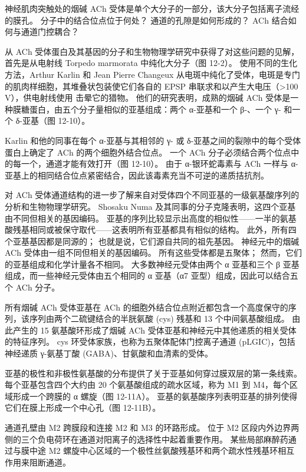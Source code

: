 神经肌肉突触处的烟碱 ACh 受体是单个大分子的一部分，该大分子包括离子流经的膜孔。 
分子中的结合位点位于何处？ 通道的孔隙是如何形成的？ ACh 结合如何与通道门控耦合？


从 ACh 受体蛋白及其基因的分子和生物物理学研究中获得了对这些问题的见解，首先是从电射线 Torpedo marmorata 中纯化大分子（图 12-2）。 
使用不同的生化方法，Arthur Karlin 和 Jean Pierre Changeux 从电斑中纯化了受体，电斑是专门的肌肉样细胞，其堆叠状包装使它们各自的 EPSP 串联求和以产生大电压（>100 V），供电射线使用 击晕它的猎物。 
他们的研究表明，成熟的烟碱 ACh 受体是一种膜糖蛋白，由五个分子量相似的亚基组成：两个 α-亚基和一个 β-、一个 γ- 和一个 δ-亚基（图 12-10）。


Karlin 和他的同事在每个 α-亚基与其相邻的 γ- 或 δ-亚基之间的裂隙中的每个受体蛋白上确定了 ACh 的两个细胞外结合位点。 
一个 ACh 分子必须结合两个位点中的每一个，通道才能有效打开（图 12-10）。 
由于 α-银环蛇毒素与 ACh 一样与 α-亚基上的相同结合位点紧密结合，因此该毒素充当不可逆的递质拮抗剂。


对 ACh 受体通道结构的进一步了解来自对受体四个不同亚基的一级氨基酸序列的分析和生物物理学研究。 
Shosaku Numa 及其同事的分子克隆表明，这四个亚基由不同但相关的基因编码。 
亚基的序列比较显示出高度的相似性——一半的氨基酸残基相同或被保守取代——这表明所有亚基都具有相似的结构。 
此外，所有四个亚基基因都是同源的； 也就是说，它们源自共同的祖先基因。 
神经元中的烟碱 ACh 受体由一组不同但相关的基因编码。 
所有这些受体都是五聚体； 然而，它们的亚基组成和化学计量各不相同。 
大多数神经元受体由两个 α 亚基和三个 β 亚基组成，而一些神经元受体由五个相同的 α 亚基（α7 亚型）组成，因此可以结合五个 ACh 分子。


所有烟碱 ACh 受体亚基在 ACh 的细胞外结合位点附近都包含一个高度保守的序列，该序列由两个二硫键结合的半胱氨酸 (cys) 残基和 13 个中间氨基酸组成。 
由此产生的 15 氨基酸环形成了烟碱 ACh 受体亚基和神经元中其他递质的相关受体的特征序列。 cys 环受体家族，也称为五聚体配体门控离子通道 (pLGIC)，包括神经递质 γ-氨基丁酸 (GABA)、甘氨酸和血清素的受体。


亚基的极性和非极性氨基酸的分布提供了关于亚基如何穿过膜双层的第一条线索。 
每个亚基包含四个大约由 20 个氨基酸组成的疏水区域，称为 M1 到 M4，每个区域形成一个跨膜的 α 螺旋（图 12-11A）。 亚基的氨基酸序列表明亚基的排列使得它们在膜上形成一个中心孔（图 12-11B）。


通道孔壁由 M2 跨膜段和连接 M2 和 M3 的环路形成。 
位于 M2 区段内外边界两侧的三个负电荷环在通道对阳离子的选择性中起着重要作用。 
某些局部麻醉药通过与膜中途 M2 螺旋中心区域的一个极性丝氨酸残基环和两个疏水性残基环相互作用来阻断通道。


